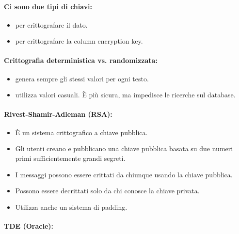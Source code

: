 \paragraph{Ci sono due tipi di chiavi:}

\begin{itemize}
  \item {} per crittografare il dato. 
  \item {} per crittografare la column encryption key.
\end{itemize}


\paragraph{Crittografia deterministica vs. randomizzata:}

\begin{itemize}
  \item {} genera sempre gli stessi valori per ogni testo. 
  \item {} utilizza valori casuali. È più sicura, ma impedisce le ricerche sul database.
    
\end{itemize}

\paragraph{Rivest-Shamir-Adleman (RSA):}

\begin{itemize}
  \item È un sistema crittografico a chiave pubblica. 
  \item Gli utenti creano e pubblicano una chiave pubblica basata su due numeri primi sufficientemente grandi segreti.
  \item I messaggi possono essere crittati da chiunque usando la chiave pubblica. 
  \item Possono essere decrittati solo da chi conosce la chiave privata.
  \item Utilizza anche un sistema di padding.
\end{itemize}

\paragraph{TDE (Oracle):}

